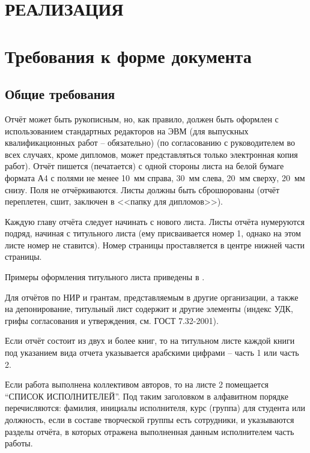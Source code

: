 \documentclass[utf8,14pt, coursreport]{G7-32}
\begin{document}
\chapter{РЕАЛИЗАЦИЯ}


\iffalse
\chapter{Требования к форме документа}

\section{Общие требования}

Отчёт может быть рукописным, но, как правило, должен быть оформлен с использованием стандартных редакторов на ЭВМ (для выпускных квалификационных работ -- обязательно) (по согласованию с руководителем во всех случаях, кроме дипломов, может представляться только электронная копия работ). Отчёт пишется (печатается) с одной стороны листа на белой бумаге формата А4 с полями не менее 10~мм справа, 30~мм слева, 20~мм сверху, 20~мм снизу. Поля не отчёркиваются. Листы должны быть сброшюрованы (отчёт переплетен, сшит, заключен в <<папку для дипломов>>).

Каждую главу отчёта следует начинать с нового листа. Листы отчёта нумеруются подряд, начиная с титульного листа (ему присваивается номер 1, однако на этом листе номер не ставится). Номер страницы проставляется в центре нижней части страницы.

Примеры оформления титульного листа приведены в \cite{dferules}.

Для отчётов по НИР и грантам, представляемым в другие организации, а также на депонирование, титульный лист содержит и другие элементы (индекс УДК, грифы согласования и утверждения, см. ГОСТ 7.32-2001).

Если отчёт состоит из двух и более книг, то на титульном листе каждой книги под указанием вида отчета указывается арабскими цифрами -- часть 1 или часть 2.

Если работа выполнена коллективом авторов, то на листе 2 помещается ``СПИСОК ИСПОЛНИТЕЛЕЙ''. Под таким заголовком в алфавитном порядке перечисляются: фамилия, инициалы исполнителя, курс (группа) для студента или должность, если в составе творческой группы есть сотрудники, и указываются разделы отчёта, в которых отражена выполненная данным исполнителем часть работы.
\end{document}
